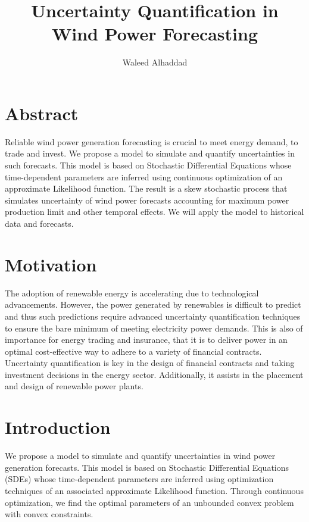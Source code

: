 \documentclass[12pt]{article}
\title{Uncertainty Quantification in Wind Power Forecasting  \\ }
\author{Waleed Alhaddad }
\date{}
\theoremstyle{definition}
\theoremstyle{remark}
\begin{document}
\maketitle

\section{Abstract}
Reliable wind power generation forecasting is crucial to meet energy demand, to trade and invest. We propose a model to simulate and quantify uncertainties in such forecasts. This model is based on Stochastic Differential Equations whose time-dependent parameters are inferred using continuous optimization of an approximate Likelihood function. The result is a skew stochastic process that simulates uncertainty of wind power forecasts accounting for maximum power production limit and other temporal effects. We will apply the model to historical  data and forecasts.



\section{Motivation}

The adoption of renewable energy is accelerating due to technological advancements. However, the power generated by renewables is difficult to predict and thus such predictions require advanced uncertainty quantification techniques to ensure the bare minimum of meeting electricity power demands. This is also of importance for energy trading and insurance, that it is to deliver power in an optimal cost-effective way to adhere to a variety of financial contracts. Uncertainty quantification is key in the design of financial contracts and taking investment decisions in the energy sector. Additionally, it assists in the placement and design of renewable power plants.

\section{Introduction}

    We propose a model to simulate and quantify uncertainties in wind power generation forecasts. This model is based on Stochastic Differential Equations (SDEs) whose time-dependent parameters are inferred using optimization techniques of an associated approximate Likelihood function. Through continuous optimization, we find the optimal parameters of an unbounded convex problem with convex constraints.
\end{document}
